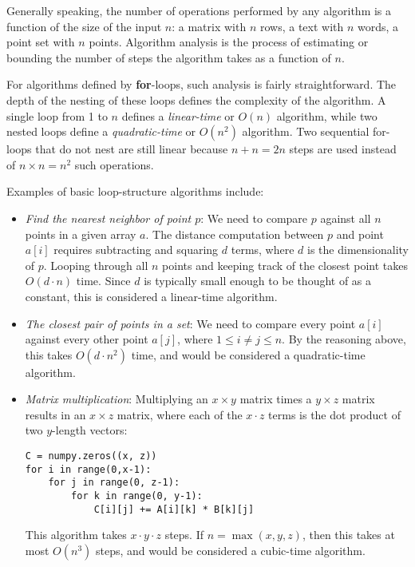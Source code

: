 \documentclass[10pt]{article}
\begin{document}
\begin{enumerate}
Generally speaking, the number of operations performed by any algorithm is a function of the size of the input $n$: a matrix with $n$ rows, a text with $n$ words, a point set with $n$ points. Algorithm analysis is the process of estimating or bounding the number of steps the algorithm takes as a function of $n$.

For algorithms defined by \textbf{for}-loops, such analysis is fairly straightforward. The depth of the nesting of these loops defines the complexity of the algorithm. A single loop from 1 to $n$ defines a \textit{linear-time} or $O(n)$ algorithm, while two nested loops define a \textit{quadratic-time} or $O(n^{2})$ algorithm. Two sequential for-loops that do not nest are still linear because $n+n=2n$ steps are used instead of $n \times n=n^{2}$ such operations.

Examples of basic loop-structure algorithms include:
\begin{itemize}
    \item \textit{Find the nearest neighbor of point $p$}: We need to compare $p$ against all $n$ points in a given array $a$. The distance computation between $p$ and point $a[i]$ requires subtracting and squaring $d$ terms, where $d$ is the dimensionality of $p$. Looping through all $n$ points and keeping track of the closest point takes $O(d \cdot n)$ time. Since $d$ is typically small enough to be thought of as a constant, this is considered a linear-time algorithm.
    \item \textit{The closest pair of points in a set}: We need to compare every point $a[i]$ against every other point $a[j]$, where $1 \leq i \neq j \leq n$. By the reasoning above, this takes $O(d \cdot n^{2})$ time, and would be considered a quadratic-time algorithm.
    \item \textit{Matrix multiplication}: Multiplying an $x \times y$ matrix times a $y \times z$ matrix results in an $x \times z$ matrix, where each of the $x \cdot z$ terms is the dot product of two $y$-length vectors:
    \begin{verbatim}
C = numpy.zeros((x, z))
for i in range(0,x-1):
    for j in range(0, z-1):
        for k in range(0, y-1):
            C[i][j] += A[i][k] * B[k][j]
    \end{verbatim}
    This algorithm takes $x \cdot y \cdot z$ steps. If $n=\max(x, y, z)$, then this takes at most $O(n^{3})$ steps, and would be considered a cubic-time algorithm.
\end{itemize}


\end{enumerate}
\end{document}
